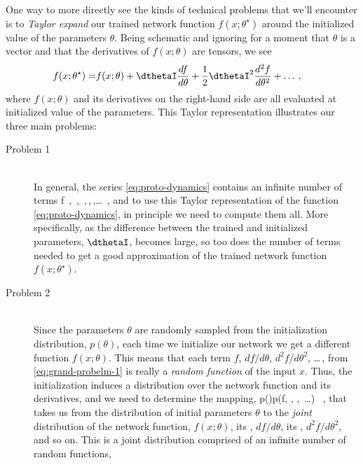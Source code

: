 One way to more directly see the kinds of technical problems that we'll encounter 
is to \emph{Taylor expand} our trained network function $f(x;\theta^\star)$ around the initialized value of the parameters $\theta$. Being schematic and ignoring for a moment that $\theta$ is a vector and that the derivatives of $f(x;\theta)$ are tensors, we see
\begin{align}\label{eq:proto-dynamics}
f(x;\theta^\star) =&f(x;\theta) +\dthetaI \frac{df}{d\theta } +\frac{1}{2} \dthetaI^2  \frac{d^2f }{d\theta^2}+\ldots\,,  
\end{align}
where $f(x;\theta)$ and its derivatives on the right-hand side are all evaluated at initialized value of the parameters. This Taylor representation illustrates our three main problems:
\begin{description}
\item[Problem 1]~\\ 
In general, the series \eqref{eq:proto-dynamics} contains an infinite number of terms
\be\label{eq:grand-probelm-1}
f\, ,\quad {}\, ,\quad {}\, ,\quad {}\,,\quad {}\,,\quad \dots \, , %
\ee
and to use this Taylor representation of the function \eqref{eq:proto-dynamics}, in principle we need to compute them all. 
More specifically, as the difference between the trained and initialized parameters, $\dthetaI$, becomes large, so too does the number of terms 
 needed to get a good approximation of the trained network function $f(x;\theta^\star)$.
\item[Problem 2]~\\ 
Since the parameters $\theta$ are randomly sampled from the initialization distribution, 
$p(\theta)$,
each time we initialize our network 
we get a different function $f(x;\theta)$.
This means that each term $f$, $df/d\theta$, $d^2f/d\theta^2$, \ldots\,, from \eqref{eq:grand-probelm-1} is really a \emph{random function} of the input $x$.
Thus, 
the initialization
induces a distribution over the network function and its derivatives, and we need to determine the mapping,
\be\label{eq:grand-probelm-2}
p(\theta)\to p\!\le(f, , ,\, \dots  \ri) \, ,
\ee
that takes us from the distribution of initial parameters $\theta$ to the \emph{joint} distribution of the network function, $f(x;\theta)$, its , $df/d\theta$, its ,  $d^2f/d\theta^2$, and so on. This is a joint distribution comprised of an infinite number of random functions,

\end{description}
